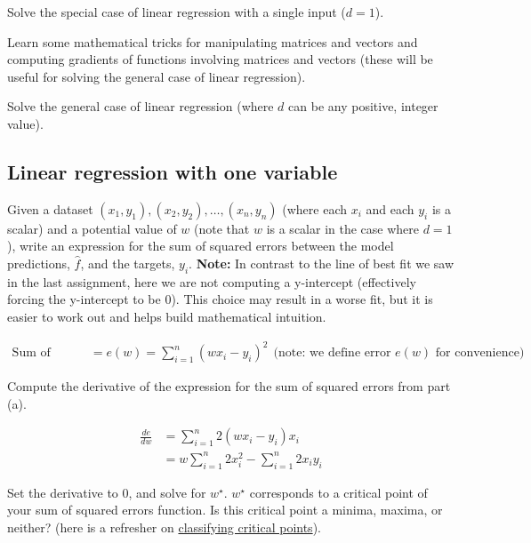 \documentclass[assignment02_Solutions]{subfiles}
\begin{document}
\be
\item Solve the special case of linear regression with a single input ($d=1$).
\item Learn some mathematical tricks for manipulating matrices and vectors and computing gradients of functions involving matrices and vectors (these will be useful for solving the general case of linear regression).
\item Solve the general case of linear regression (where $d$ can be any positive, integer value).
\ee

\subsection{Linear regression with one variable}

\begin{exercise}[(20 minutes)]
\bes
\item Given a dataset $(x_1, y_1), (x_2, y_2), \ldots, (x_n, y_n)$ (where each $x_i$ and each $y_i$ is a scalar) and a potential value of $w$ (note that $w$ is a scalar in the case where $d=1$), write an expression for the sum of squared errors between the model predictions, $\hat{f}$, and the targets, $y_i$.  \textbf{Note:} In contrast to the line of best fit we saw in the last assignment, here we are not computing a y-intercept (effectively forcing the y-intercept to be $0$).  This choice may result in a worse fit, but it is easier to work out and helps build mathematical intuition.

\begin{boxedsolution}
\begin{align}
\mbox{Sum of Squared Errors} &= e(w) = \sum_{i=1}^n \left (  w x_i - y_i \right)^2~~\mbox{(note: we define error $e(w)$ for convenience)}
\end{align}
\end{boxedsolution}

\item Compute the derivative of the expression for the sum of squared errors from part (a).

\begin{boxedsolution}
\begin{align}
\frac{de}{dw} & = \sum_{i=1}^n 2 \left (  w x_i - y_i \right)x_i  \\
&= w \sum_{i=1}^n 2 x_i^2 - \sum_{i=1}^n 2 x_i y_i
\end{align}
\end{boxedsolution}

\item Set the derivative to 0, and solve for $w^\star$.  $w^\star$ corresponds to a critical point of your sum of squared errors function.  Is this critical point a minima, maxima, or neither? (here is a refresher on \href{http://homes.sice.indiana.edu/donbyrd/Teach/M119WebPage/Finding+ClassifyingCriticalPoints.pdf}{classifying critical points}).
 

\end{exercise}
\end{document}
